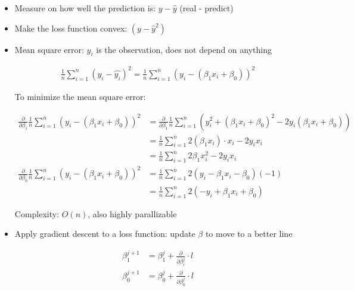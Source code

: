 \documentclass[11pt,letterpaper,titlepage]{article}
\begin{document}
\begin{itemize}
    
    \item Measure on how well the prediction is: $y - \hat{y}$ (real - predict)
    
    \item Make the loss function convex: $(y - \hat{y}^2)$
    
    \item Mean square error: $y_i$ is the observation, does not depend on anything
    
    \begin{equation*}
        \begin{aligned}
            \frac{1}{n} \sum_{i=1}^{n} (y_i - \hat{y_i})^2 = \frac{1}{n} \sum_{i=1}^{n} (y_i - (\beta_1 x_i + \beta_0))^2
        \end{aligned}
    \end{equation*}
    
    To minimize the mean square error:
    
    \begin{equation*}
        \begin{aligned}
            \frac{\partial}{\partial \beta_1} \frac{1}{n} \sum_{i=1}^{n} (y_i - (\beta_1 x_i + \beta_0))^2 &= \frac{\partial}{\partial \beta_1} \frac{1}{n} \sum_{i=1}^{n} (y_i^2 + (\beta_1 x_i + \beta_0)^2 - 2 y_i (\beta_1 x_i + \beta_0)) \\
            &= \frac{1}{n} \sum_{i=1}^{n} 2(\beta_1 x_i) \cdot x_i - 2 y_i x_i \\
            &= \frac{1}{n} \sum_{i=1}^{n} 2\beta_1 x_i^2 - 2 y_i x_i \\
            \frac{\partial}{\partial \beta_0} \frac{1}{n} \sum_{i=1}^{n} (y_i - (\beta_1 x_i + \beta_0))^2 &= \frac{1}{n} \sum_{i=1}^{n} 2 (y_i - \beta_1 x_i - \beta_0)(-1) \\
            &= \frac{1}{n} \sum_{i=1}^{n} 2 ( - y_i + \beta_1 x_i + \beta_0)
        \end{aligned}
    \end{equation*}
    
    Complexity: $O(n)$, also highly parallizable
    
    \item Apply gradient descent to a loss function: update $\beta$ to move to a better line
    
    \begin{equation*}
        \begin{aligned}
            \beta_1^{j+1} &= \beta_1^{j} + \frac{\partial}{\partial \beta_i^j} \cdot l \\
            \beta_0^{j+1} &= \beta_0^{j} + \frac{\partial}{\partial \beta_0^j} \cdot l \\
        \end{aligned}
    \end{equation*}
    
\end{itemize}
\end{document}
